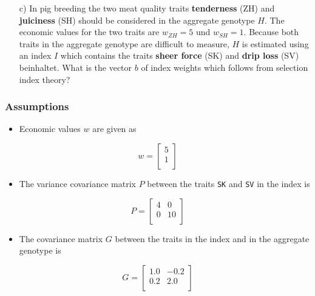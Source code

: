 \documentclass[]{article}
\providecommand{\tightlist}{%
  \setlength{\itemsep}{0pt}\setlength{\parskip}{0pt}}
\begin{document}
\clearpage
\pagebreak

\begin{enumerate}
\item[c)] In pig breeding the two meat quality traits \textbf{tenderness} (ZH) and \textbf{juiciness} (SH) should be considered in the aggregate genotype $H$. The economic values for the two traits are $w_{ZH} = 5$ und $w_{SH} = 1$. Because both traits in the aggregate genotype are difficult to measure, $H$ is estimated using an index $I$ which contains the traits \textbf{sheer force} (SK) and \textbf{drip loss} (SV) beinhaltet. What is the vector $b$ of index weights which follows from selection index theory? 
\end{enumerate}

\subsubsection{Assumptions}\label{assumptions}

\begin{itemize}
\tightlist
\item
  Economic values \(w\) are given as
\end{itemize}

\[w = \left[
\begin{array}{r}
  5 \\ 
  1 \\ 
  \end{array}\right]
\]

\begin{itemize}
\tightlist
\item
  The variance covariance matrix \(P\) between the traits \texttt{SK}
  and \texttt{SV} in the index is
\end{itemize}

\[P = \left[
\begin{array}{rr}
  4 & 0 \\ 
  0 & 10 \\ 
  \end{array}\right]
\]

\begin{itemize}
\tightlist
\item
  The covariance matrix \(G\) between the traits in the index and in the
  aggregate genotype is
\end{itemize}

\[G = \left[
\begin{array}{rr}
  1.0 & -0.2 \\ 
  0.2 & 2.0 \\ 
  \end{array}\right]
\]
\end{document}
